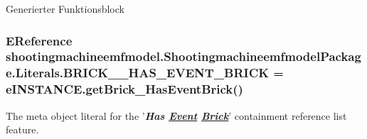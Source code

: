 Generierter Funktionsblock \hypertarget{interfaceshootingmachineemfmodel_1_1_shootingmachineemfmodel_package_1_1_literals_a34373f53d36caa5f691d30fbca28baf6}{
\subsubsection[{B\-R\-I\-C\-K\-\_\-\-\_\-\-H\-A\-S\-\_\-\-E\-V\-E\-N\-T\-\_\-\-B\-R\-I\-C\-K}]{\setlength{\rightskip}{0pt plus 5cm}E\-Reference shootingmachineemfmodel.\-Shootingmachineemfmodel\-Package.\-Literals.\-B\-R\-I\-C\-K\-\_\-\-\_\-\-H\-A\-S\-\_\-\-E\-V\-E\-N\-T\-\_\-\-B\-R\-I\-C\-K = e\-I\-N\-S\-T\-A\-N\-C\-E.\-get\-Brick\-\_\-\-Has\-Event\-Brick()}}\label{interfaceshootingmachineemfmodel_1_1_shootingmachineemfmodel_package_1_1_literals_a34373f53d36caa5f691d30fbca28baf6}
The meta object literal for the '{\itshape {\bfseries Has \hyperlink{interfaceshootingmachineemfmodel_1_1_event}{Event} \hyperlink{interfaceshootingmachineemfmodel_1_1_brick}{Brick}}}' containment reference list feature.

